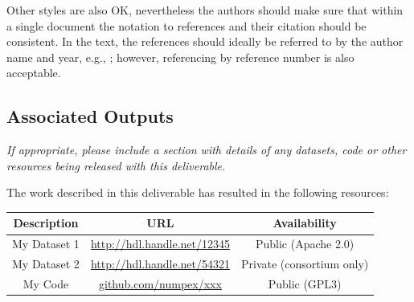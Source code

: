 Other styles are also OK, nevertheless the authors should make sure that within a single document the notation to references and their citation should be consistent. In the text, the references should ideally be referred to by the author name and year, e.g., \cite{bib:lamport1994}; however, referencing by reference number is also acceptable.

\subsection{Associated Outputs}
\label{sec:associated-outputs}

\textit{If appropriate, please include a section with details of any datasets, code or other resources being released with this deliverable.}

The work described in this deliverable has resulted in the following resources:

\begin{center}
    \def\arraystretch{1.25}		
    \begin{tabular}{|c|c|c|}
        \hline
        \rowcolor{numpexgray}
        \color{white} Description & 
        \color{white} URL & 
        \color{white} Availability 
        \\\hline
    
        \rowcolor{white}\color{numpexfont} 
        My Dataset 1 &  
        \url{http://hdl.handle.net/12345} &
        Public (Apache 2.0) \\
    
        \rowcolor{numpexlightergray}\color{numpexfont} 
        My Dataset 2 &  
        \url{http://hdl.handle.net/54321} &
        Private (consortium only) \\
    
        \rowcolor{white}\color{numpexfont} 
        My Code &  
        \url{github.com/numpex/xxx} &
        Public (GPL3) \\
    
        \hline
    \end{tabular}
\end{center}

